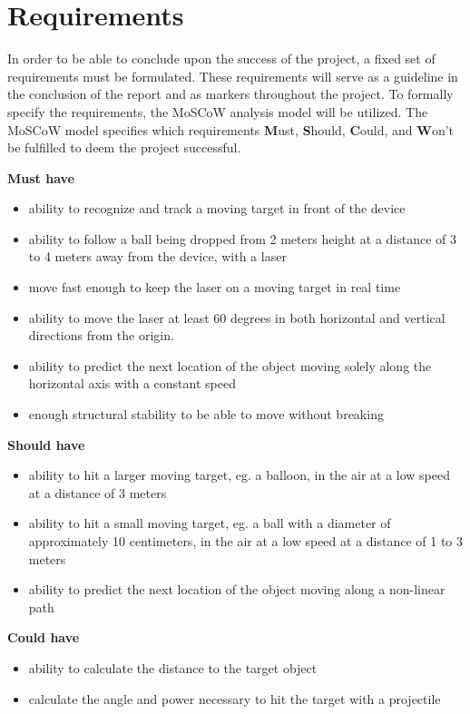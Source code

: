 \section{Requirements}
In order to be able to conclude upon the success of the project, a fixed set of requirements must be formulated.
These requirements will serve as a guideline in the conclusion of the report and as markers throughout the project. 
To formally specify the requirements, the MoSCoW analysis model will be utilized. 
The MoSCoW model specifies which requirements \textbf{M}ust, \textbf{S}hould, \textbf{C}ould, and \textbf{W}on't be fulfilled to deem the project successful.

\textbf{Must have}
\begin{itemize}
\item ability to recognize and track a moving target in front of the device
\item ability to follow a ball being dropped from 2 meters height at a distance of 3 to 4 meters away from the device, with a laser
\item move fast enough to keep the laser on a moving target in real time
\item ability to move the laser at least 60 degrees in both horizontal and vertical directions from the origin.
\item ability to predict the next location of the object moving solely along the horizontal axis with a constant speed
\item enough structural stability to be able to move without breaking
\end{itemize}

\textbf{Should have}
\begin{itemize}
\item ability to hit a larger moving target, eg. a balloon, in the air at a low speed at a distance of 3 meters
\item ability to hit a small moving target, eg. a ball with a diameter of approximately 10 centimeters, in the air at a low speed at a distance of 1 to 3 meters
\item ability to predict the next location of the object moving along a non-linear path
\end{itemize}

\textbf{Could have}
\begin{itemize}
\item ability to calculate the distance to the target object
\item calculate the angle and power necessary to hit the target with a projectile
\end{itemize}

